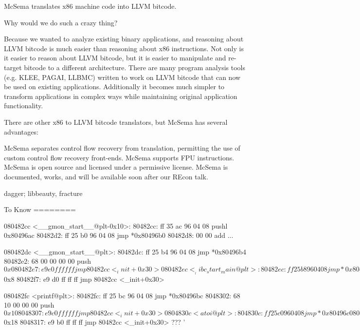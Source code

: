 
McSema translates x86 machine code into LLVM bitcode.

Why would we do such a crazy thing?

Because we wanted to analyze existing binary applications, and reasoning about
LLVM bitcode is much easier than reasoning about x86 instructions. Not only is
it easier to reason about LLVM bitcode, but it is easier to manipulate and
re-target bitcode to a different architecture. There are many program analysis
tools (e.g. KLEE, PAGAI, LLBMC) written to work on LLVM bitcode that can now be
used on existing applications. Additionally it becomes much simpler to
transform applications in complex ways while maintaining original application
functionality.

There are other x86 to LLVM bitcode translators, but McSema has several advantages:

    McSema separates control flow recovery from translation, permitting the use of custom control flow recovery front-ends.
    McSema supports FPU instructions.
    McSema is open source and licensed under a permissive license.
    McSema is documented, works, and will be available soon after our REcon talk.


dagger; libbeauty, fracture    















To Know
========

080482cc <__gmon_start__@plt-0x10>:
 80482cc:	ff 35 ac 96 04 08    	pushl  0x80496ac
 80482d2:	ff 25 b0 96 04 08    	jmp    *0x80496b0
 80482d8:	00 00                	add    %
	...

080482dc <__gmon_start__@plt>:
 80482dc:	ff 25 b4 96 04 08    	jmp    *0x80496b4
 80482e2:	68 00 00 00 00       	push   $0x0
 80482e7:	e9 e0 ff ff ff       	jmp    80482cc <_init+0x30>

080482ec <__libc_start_main@plt>:
 80482ec:	ff 25 b8 96 04 08    	jmp    *0x80496b8
 80482f2:	68 08 00 00 00       	push   $0x8
 80482f7:	e9 d0 ff ff ff       	jmp    80482cc <_init+0x30>

080482fc <printf@plt>:
 80482fc:	ff 25 bc 96 04 08    	jmp    *0x80496bc
 8048302:	68 10 00 00 00       	push   $0x10
 8048307:	e9 c0 ff ff ff       	jmp    80482cc <_init+0x30>

0804830c <atoi@plt>:
 804830c:	ff 25 c0 96 04 08    	jmp    *0x80496c0
 8048312:	68 18 00 00 00       	push   $0x18
 8048317:	e9 b0 ff ff ff       	jmp    80482cc <_init+0x30> ???
 '

